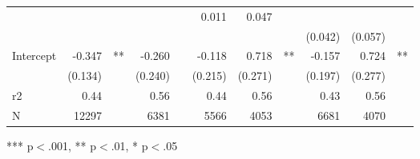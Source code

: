 \documentclass{article}
\begin{document}
\begin{table}[!h]
\begin{tabular}{lllllllllll}
  \multicolumn{1}{r}{} &
  \multicolumn{1}{l}{} &
  \multicolumn{1}{r}{} &
  \multicolumn{1}{r}{} &
  \multicolumn{1}{l}{} &
  \multicolumn{1}{r}{0.011} &
  \multicolumn{1}{r}{0.047} &
  \multicolumn{1}{l}{} \\
\multicolumn{1}{l}{} &
  \multicolumn{1}{r}{} &
  \multicolumn{1}{l}{} &
  \multicolumn{1}{r}{} &
  \multicolumn{1}{l}{} &
  \multicolumn{1}{r}{} &
  \multicolumn{1}{r}{} &
  \multicolumn{1}{l}{} &
  \multicolumn{1}{r}{(0.042)} &
  \multicolumn{1}{r}{(0.057)} &
  \multicolumn{1}{l}{} \\
\multicolumn{1}{l}{Intercept} &
  \multicolumn{1}{r}{-0.347} &
  \multicolumn{1}{l}{**} &
  \multicolumn{1}{r}{-0.260} &
  \multicolumn{1}{l}{} &
  \multicolumn{1}{r}{-0.118} &
  \multicolumn{1}{r}{0.718} &
  \multicolumn{1}{l}{**} &
  \multicolumn{1}{r}{-0.157} &
  \multicolumn{1}{r}{0.724} &
  \multicolumn{1}{l}{**} \\
\multicolumn{1}{l}{} &
  \multicolumn{1}{r}{(0.134)} &
  \multicolumn{1}{l}{} &
  \multicolumn{1}{r}{(0.240)} &
  \multicolumn{1}{l}{} &
  \multicolumn{1}{r}{(0.215)} &
  \multicolumn{1}{r}{(0.271)} &
  \multicolumn{1}{l}{} &
  \multicolumn{1}{r}{(0.197)} &
  \multicolumn{1}{r}{(0.277)} &
  \multicolumn{1}{l}{} \\
\multicolumn{1}{l}{r2} &
  \multicolumn{1}{r}{0.44} &
  \multicolumn{1}{l}{} &
  \multicolumn{1}{r}{0.56} &
  \multicolumn{1}{l}{} &
  \multicolumn{1}{r}{0.44} &
  \multicolumn{1}{r}{0.56} &
  \multicolumn{1}{l}{} &
  \multicolumn{1}{r}{0.43} &
  \multicolumn{1}{r}{0.56} &
  \multicolumn{1}{l}{} \\
\multicolumn{1}{l}{N} &
  \multicolumn{1}{r}{12297} &
  \multicolumn{1}{l}{} &
  \multicolumn{1}{r}{6381} &
  \multicolumn{1}{l}{} &
  \multicolumn{1}{r}{5566} &
  \multicolumn{1}{r}{4053} &
  \multicolumn{1}{l}{} &
  \multicolumn{1}{r}{6681} &
  \multicolumn{1}{r}{4070} &
  \multicolumn{1}{l}{} \\
\cline{1-11}
\end{tabular}

\footnotesize{
*** p$<$.001, ** p$<$.01, * p$<$.05
}
\end{table}
\end{document}
